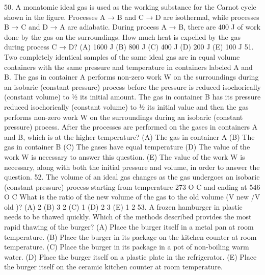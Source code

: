 50. A monatomic ideal gas is used as the working substance for the Carnot cycle shown in the figure. Processes A
→ B and C → D are isothermal, while processes B → C and D → A are adiabatic. During process A → B,
there are 400 J of work done by the gas on the surroundings. How much heat is expelled by the gas during
process C → D?
(A) 1600 J (B) 800 J (C) 400 J (D) 200 J (E) 100 J
51. Two completely identical samples of the same ideal gas are in equal volume containers with the same pressure
and temperature in containers labeled A and B. The gas in container A performs non-zero work W on the
surroundings during an isobaric (constant pressure) process before the pressure is reduced isochorically
(constant volume) to 1⁄2 its initial amount. The gas in container B has its pressure reduced isochorically
(constant volume) to 1⁄2 its initial value and then the gas performs non-zero work W on the surroundings during
an isobaric (constant pressure) process.
After the processes are performed on the gases in containers A and B, which is at the higher temperature?
(A) The gas in container A
(B) The gas in container B
(C) The gases have equal temperature
(D) The value of the work W is necessary to answer this question.
(E) The value of the work W is necessary, along with both the initial pressure and volume, in order to answer
the question.
52. The volume of an ideal gas changes as the gas undergoes an isobaric (constant pressure) process starting from
temperature 273 O C and ending at 546 O C What is the ratio of the new volume of the gas to the old volume
(V new /V old )?
(A) 2
(B)
3
2
(C) 1
(D)
2
3
(E)
1
2
53. A frozen hamburger in plastic needs to be thawed quickly. Which of the methods described provides the most
rapid thawing of the burger?
(A) Place the burger itself in a metal pan at room temperature.
(B) Place the burger in its package on the kitchen counter at room temperature.
(C) Place the burger in its package in a pot of non-boiling warm water.
(D) Place the burger itself on a plastic plate in the refrigerator.
(E) Place the burger itself on the ceramic kitchen counter at room temperature.



